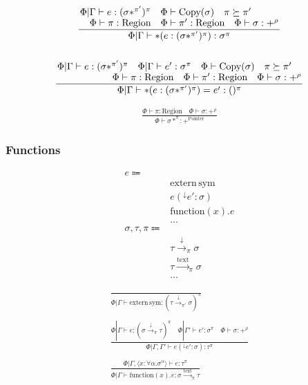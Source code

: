\documentclass {article}
\begin{document}
\begin{gather*}
\frac
{\splitfrac{\Phi | \Gamma \vdash e : (\sigma *^{\pi'})^\pi \quad \Phi \vdash \text{Copy} (\sigma) \quad \pi \succeq \pi'}
{\Phi \vdash \pi : \text{Region} \quad \Phi \vdash \pi' : \text{Region} \quad \Phi \vdash \sigma : +^{\rho}}}
{\Phi | \Gamma \vdash * (e : (\sigma *^{\pi'})^\pi)  : \sigma^\pi} \\
\\
\frac
{\splitfrac{\Phi | \Gamma \vdash e : (\sigma *^{\pi'})^\pi \quad \Phi | \Gamma \vdash e' : \sigma^\pi  \quad \Phi \vdash \text{Copy} (\sigma) \quad \pi \succeq \pi'}
{\Phi \vdash \pi : \text{Region} \quad \Phi \vdash \pi' : \text{Region} \quad \Phi \vdash \sigma : +^{\rho}}}
{\Phi | \Gamma \vdash *(e : (\sigma *^{\pi'})^\pi) = e' : ()^\pi }
\end{gather*}

\begin{gather*}
\frac
{\Phi \vdash \pi : \text{Region} \quad \Phi \vdash \sigma : +^{\rho}}
{\Phi \vdash \sigma *^\pi : +^{\text{Pointer}}}
\end{gather*}

\subsubsection{Functions}

\begin{align*}
e \Coloneqq & \\
& \text{extern} \, \text{sym} \tag{Extern Function} \\
& e(^\downarrow e' : \sigma) \tag{Function Pointer Application} \\
& \text{function} (x). e \tag{Function Literal} \\
& \dots \\
\sigma, \tau, \pi \Coloneqq & \\
& \tau \xrightarrow{\downarrow}_\pi \sigma \tag{Function Pointer}\\
& \tau \xrightarrow{\text{text}}_\pi \sigma  \tag{Function Literal Type} \\
& \dots
\end{align*}

\begin{gather*}
\frac
{}
{\Phi | \Gamma \vdash \text{extern} \, \text{sym} : (\tau \xrightarrow{\downarrow}_{\pi'} \sigma)^\pi} \\
\\
\frac
{\Phi | \Gamma \vdash e : (\sigma \xrightarrow{\downarrow}_\pi \tau)^\pi \quad \Phi | \Gamma' \vdash e' : \sigma^\pi \quad \Phi \vdash \sigma : +^{\rho}}
{\Phi | \Gamma, \Gamma' \vdash e(^\downarrow e' : \sigma) : \tau^\pi} \\
\\
\frac
{\Phi | \Gamma, \langle x : \forall \alpha. \sigma^\alpha \rangle \vdash e : \tau^\pi}
{\Phi | \Gamma \vdash \text{function}(x). e : \sigma \xrightarrow{\text{text}}_\pi \tau} \\
\end{gather*}
\end{document}
